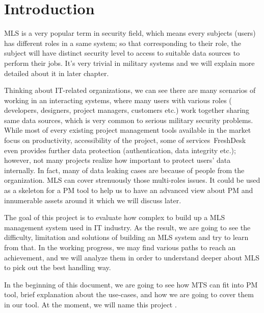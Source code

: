 
\chapter{Introduction} %

\label{ch:introduction} %


MLS is a very popular term in security field, which means every subjects (\ie users) has different roles in a same system;
so that corresponding to their role, the subject will have distinct security level to access to suitable data sources to perform their jobs.
It's very trivial in military systems and we will explain more detailed about it in later chapter.

Thinking about IT-related organizations, we can see there are many scenarios of working in an interacting systems, where many users with various roles (\eg\,developers, designers, project managers, customers etc.) work together sharing same data sources, which is very common to serious military security problems.
While most of every existing project management tools available in the market focus on productivity, accessibility of the project, some of services \eg\,FreshDesk even provides further data protection (authentication, data integrity etc.);
however, not many projects realize how important to protect users' data internally. In fact, many of data leaking cases are because of people from the organization. MLS can cover strenuously those multi-roles issues. It could be used as a skeleton for a PM tool to help us to have an advanced view about PM and innumerable assets around it which we will discuss later.

The goal of this project is to evaluate how complex to build up a MLS management system used in IT industry.
As the result, we are going to see the difficulty, limitation and solutions of building an MLS system and try to learn from that.
In the working progress, we may find various paths to reach an achievement, and we will analyze them in order to understand deeper about MLS to pick out the best handling way.

In the beginning of this document, we are going to see how MTS can fit into PM tool, brief explanation about the use-cases, and how we are going to cover them in our tool.
At the moment, we will name this project \myProject.

